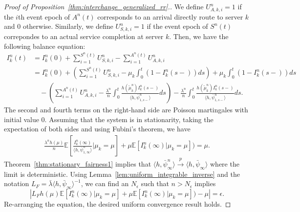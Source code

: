 \documentclass[a4paper,11pt,twoside]{article}
\numberwithin{equation}{section}
\numberwithin{figure}{section}
\theoremstyle{plain}
\newcommand{\EE}{\mathbb{E}}
\newcommand{\1}{\mathbbm{1}}
\newcommand{\toP}{\stackrel{p}{\rightarrow}}
\begin{document}
\begin{proof}[Proof of Proposition~\ref{thm:interchange_generalized_rr}.]
We define $U_{A,k,i}^n=1$ if the $i$th event epoch of $A^n(t)$ corresponds to an arrival directly route to server $k$ and 0 otherwise. Similarly, we define $U_{S,k,i}^n=1$ if the event epoch of $S^n(t)$ correpondes to an actual service completion at server $k$. Then, we have the following balance equation:
\begin{align*}
    I_k^n(t) &= I_k^n(0) + \sum_{i=1}^{S^n(t)}U_{S,k,i}^n- \sum_{i=1}^{A^n(t)}U_{A,k,i}^n\\
    &=I_k^n(0) + \left(\sum_{i=1}^{S^n(t)}U_{S,k,i}^n-\mu_k\int_0^t(1-I_k^n(s-))ds\right) + \mu_k\int_0^t(1-I_k^n(s-))ds\\ &\quad -\left(\sum_{i=1}^{A^n(t)}U_{A,k,i}^n - \frac{\lambda^n}{n}\int_0^t\frac{h(\tilde{\mu}_k^n)I_k^n(s-)}{\langle h,\bar{\psi}_{1,s-}^n \rangle }ds\right)-\frac{\lambda^n}{n}\int_0^t\frac{h(\tilde{\mu}_k^n)I_k^n(s-)}{\langle h,\bar{\psi}_{1,s-}^n \rangle }ds.
\end{align*}
The second and fourth terms on the right-hand side are Poisson martingales with initial value 0. Assuming that the system is in stationarity, taking the expectation of both sides and using Fubini's theorem, we have
\begin{align*}
 \frac{\lambda^nh(\mu)}{n}\EE\left[\frac{I_k^n(\infty)}{\langle h,\bar{\psi}_{1,\infty}^n \rangle }|\mu_k=\mu\right]+\mu\EE[I_k^n(\infty)|\mu_k=\mu])=\mu.
\end{align*}
Theorem~\ref{thm:stationary_fairness1} implies that $\langle h,\bar{\psi}_\infty^n\rangle\toP \langle h,\bar{\psi}_\infty\rangle$ where the limit is deterministic. Using Lemma~\ref{lem:uniform_integrable_inverse} and the notation $L_F=\bar{\lambda}\langle h,\bar{\psi}_\infty\rangle^{-1}$, we can find an $N_\epsilon$ such that $n>N_\epsilon$ implies
\[
\left|L_Fh(\mu)\EE[I_k^n(\infty)|\mu_k=\mu]+\mu\EE[I_k^n(\infty)|\mu_k=\mu])-\mu\right|=\epsilon.
\]
Re-arranging the equation, the desired uniform convergence result holds.  
\end{proof}
\end{document}
